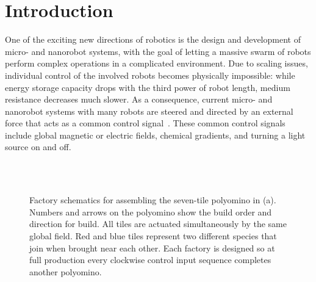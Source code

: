\section{Introduction}\label{sec:Intro}

One of the exciting new directions of robotics is the design and development
of micro- and nanorobot systems, with the goal of letting a massive swarm of robots
perform complex operations in a complicated environment. Due to scaling 
issues, individual control of the involved robots becomes physically impossible:
while energy storage capacity drops with the third power of robot length,
medium resistance decreases much slower. As a consequence,
current micro- and nanorobot systems with many robots are steered and
directed by an external force that acts as a common control signal~\cite{Donald2013,Chiang2011,Hsi-Wen2012,Diller2013,Jing2013,Ou2013,Lanauze2013}.
These common control signals include global magnetic or electric fields,
chemical gradients, and turning a light source on and off. 

\begin{figure}
\centering
{}  \\ \vspace{-.8em}
 \\ \vspace{-.8em}      
\caption{\label{fig:factorySchematics}Factory schematics for assembling the seven-tile polyomino in (a).  Numbers and arrows on the polyomino show the build order and direction for build. All tiles are actuated simultaneously by the same global field. Red and blue tiles represent two different species that join when brought near each other. Each factory is designed so at full production every clockwise control input sequence completes another polyomino.}
\end{figure}
 
